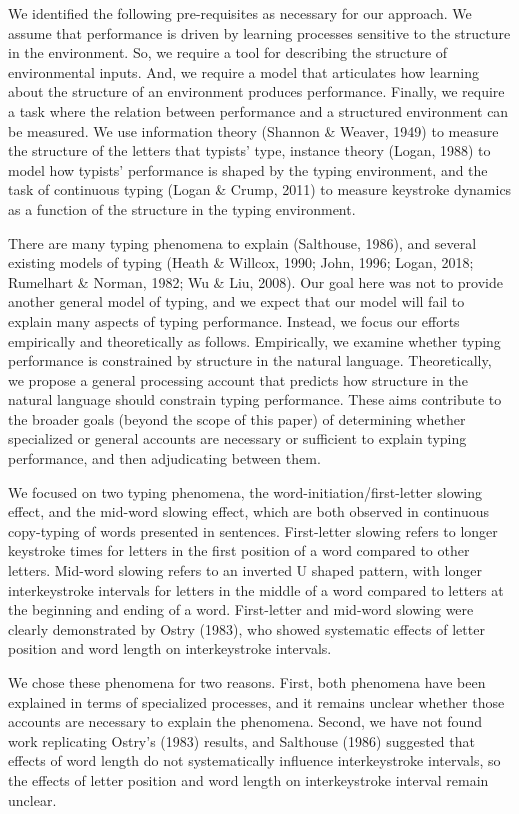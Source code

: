 \documentclass[,man,donotrepeattitle,floatsintext]{apa6}
\begin{document}
We identified the following pre-requisites as necessary for our approach. We assume that performance is driven by learning processes sensitive to the structure in the environment. So, we require a tool for describing the structure of environmental inputs. And, we require a model that articulates how learning about the structure of an environment produces performance. Finally, we require a task where the relation between performance and a structured environment can be measured. We use information theory (Shannon \& Weaver, 1949) to measure the structure of the letters that typists' type, instance theory (Logan, 1988) to model how typists' performance is shaped by the typing environment, and the task of continuous typing (Logan \& Crump, 2011) to measure keystroke dynamics as a function of the structure in the typing environment.

There are many typing phenomena to explain (Salthouse, 1986), and several existing models of typing (Heath \& Willcox, 1990; John, 1996; Logan, 2018; Rumelhart \& Norman, 1982; Wu \& Liu, 2008). Our goal here was not to provide another general model of typing, and we expect that our model will fail to explain many aspects of typing performance. Instead, we focus our efforts empirically and theoretically as follows. Empirically, we examine whether typing performance is constrained by structure in the natural language. Theoretically, we propose a general processing account that predicts how structure in the natural language should constrain typing performance. These aims contribute to the broader goals (beyond the scope of this paper) of determining whether specialized or general accounts are necessary or sufficient to explain typing performance, and then adjudicating between them.

We focused on two typing phenomena, the word-initiation/first-letter slowing effect, and the mid-word slowing effect, which are both observed in continuous copy-typing of words presented in sentences. First-letter slowing refers to longer keystroke times for letters in the first position of a word compared to other letters. Mid-word slowing refers to an inverted U shaped pattern, with longer interkeystroke intervals for letters in the middle of a word compared to letters at the beginning and ending of a word. First-letter and mid-word slowing were clearly demonstrated by Ostry (1983), who showed systematic effects of letter position and word length on interkeystroke intervals.

We chose these phenomena for two reasons. First, both phenomena have been explained in terms of specialized processes, and it remains unclear whether those accounts are necessary to explain the phenomena. Second, we have not found work replicating Ostry's (1983) results, and Salthouse (1986) suggested that effects of word length do not systematically influence interkeystroke intervals, so the effects of letter position and word length on interkeystroke interval remain unclear.
\end{document}
